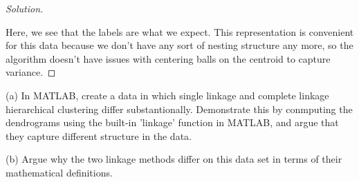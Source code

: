 \documentclass[10pt]{article}
\newenvironment{problem}[2][]{\begin{trivlist}
\item[\hskip \labelsep {\bfseries #1}\hskip \labelsep {\bfseries #2.}]}{\end{trivlist}}
\begin{document}
\begin{proof}[Solution]
\begin{figure}[H]
\begin{minipage}{.5\textwidth}
  \label{fig:test2}
\end{minipage}
\end{figure}

Here, we see that the labels are what we expect. This representation is convenient for this data because we don't have any sort of nesting structure any more, so the algorithm doesn't have issues with centering balls on the centroid to capture variance.

\end{proof}

\begin{problem}{Question 4}

(a) In MATLAB, create a data in which single linkage and complete linkage hierarchical clustering differ substantionally. Demonstrate this by conmputing the dendrograms using the built-in 'linkage' function in MATLAB, and argue that they capture different structure in the data.

(b) Argue why the two linkage methods differ on this data set in terms of their mathematical definitions.

\end{problem}
\end{document}
